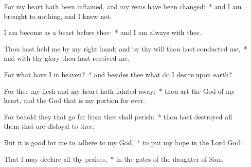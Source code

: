 \begin{enpars}
\item For my heart hath been inflamed, and my reins have been changed:~* and I am brought to nothing, and I knew not.
\item I am become as a beast before thee:~* and I am always with thee.
\item Thou hast held me by my right hand; and by thy will thou hast conducted me,~* and with thy glory thou hast received me.
\item For what have I in heaven?~* and besides thee what do I desire upon earth?
\item For thee my flesh and my heart hath fainted away:~* thou art the God of my heart, and the God that is my portion for ever.
\item For behold they that go far from thee shall perish:~* thou hast destroyed all them that are disloyal to thee.
\item But it is good for me to adhere to my God,~* to put my hope in the Lord God:
\item That I may declare all thy praises,~* in the gates of the daughter of Sion.
\end{enpars}